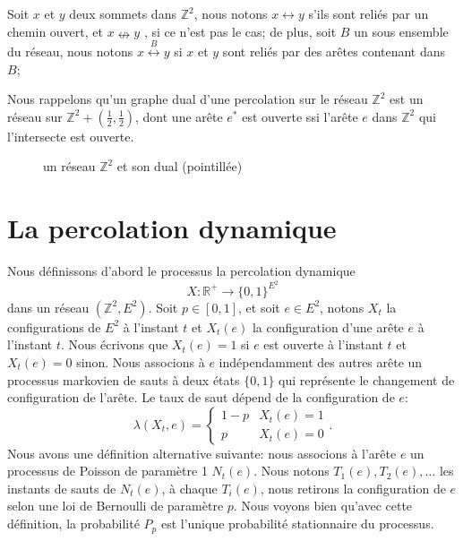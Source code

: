 \documentclass[titlepage,a4paper,12pt]{article}
\begin{document}
Soit $x$ et $y$ deux sommets dans $\mathbb{Z}^2$, nous notons $x\longleftrightarrow y$ s'ils sont reliés par un chemin ouvert, et $x\nleftrightarrow y$ , si ce n'est pas le cas; de plus, soit $B$ un sous ensemble du réseau, nous notons $x\overset{B}{\longleftrightarrow} y$ si $x$ et $y$ sont reliés par des arêtes contenant dans $B$;

Nous rappelons qu'un graphe dual d'une percolation sur le réseau $\mathbb{Z}^2$ est un réseau sur $\mathbb{Z}^2+(\frac{1}{2},\frac{1}{2})$, dont une arête $e^*$ est ouverte ssi l'arête $e$ dans $\mathbb{Z}^2$ qui l'intersecte est ouverte.

\begin{figure}[h]
\center
{}
\caption{un réseau $\mathbb{Z}^2$ et son dual (pointillée)}
\end{figure}

\section{La percolation dynamique}
Nous définissons d'abord le processus la percolation dynamique $$X: \mathbb{R}^+ \rightarrow \{0,1\}^{E^2}$$ dans un réseau $(\mathbb{Z}^2,E^2)$. 
Soit $p\in [0,1]$, et soit $e\in E^2$, notons $X_t$ la configurations de $E^2$ à l'instant $t$ et $X_t(e)$ la configuration d'une arête $e$ à l'instant $t$. Nous écrivons que $X_t(e)= 1$ si $e$ est ouverte à l'instant $t$ et $X_t(e)=0$ sinon. Nous associons à $e$ indépendamment des autres arête un processus markovien de sauts à deux états $\{0,1\}$ qui représente le changement de configuration de l'arête. Le taux de saut dépend de la configuration de $e$:
$$\lambda(X_t,e) = \left\lbrace \begin{array}{lc}
1-p & X_t(e) = 1 \\
p & X_t(e) = 0
\end{array}
\right..
$$ 
Nous avons une définition alternative suivante: nous associons à l'arête $e$ un processus de Poisson de paramètre 1 $N_t(e)$. Nous notons $T_1(e),T_2(e),\dots$ les instants de sauts de $N_t(e)$, à chaque $T_i(e)$, nous retirons la configuration de $e$ selon une loi de Bernoulli de paramètre $p$. Nous voyons bien qu'avec cette définition, la probabilité $P_p$ est l'unique probabilité stationnaire du processus.
\end{document}
